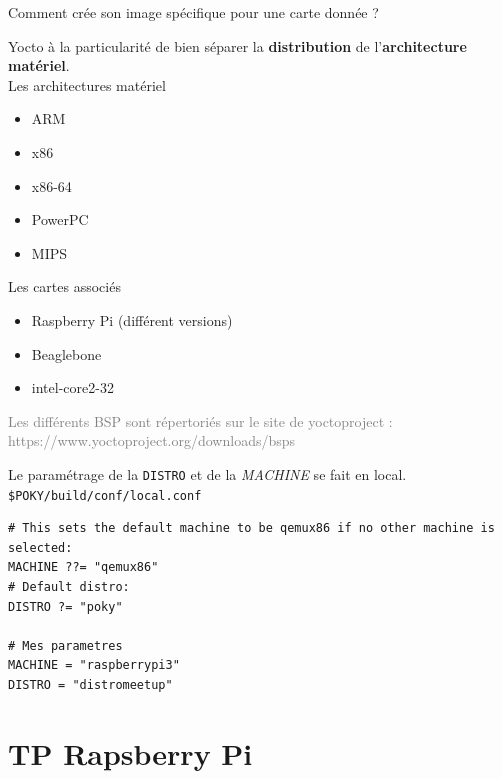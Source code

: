 \documentclass[compress]{smilebeamer}
\begin{document}
\begin{frame}
\begin{center}
\huge{Comment crée son image spécifique pour une carte donnée ?}
\end{center}
\end{frame}

\begin{frame}
Yocto à la particularité de bien séparer la \textbf{distribution} de l'\textbf{architecture matériel}.
\newline \\
Les architectures matériel
\begin{itemize}
	\item ARM
	\item x86
	\item x86-64
	\item PowerPC
	\item MIPS
\end{itemize}
Les cartes associés
\begin{itemize}
	\item Raspberry Pi (différent versions)
	\item Beaglebone
	\item intel-core2-32
\end{itemize}
\textcolor{gray}{\tiny{Les différents BSP sont répertoriés sur le site de yoctoproject : https://www.yoctoproject.org/downloads/bsps}}
\end{frame}

\begin{frame}[fragile]
Le paramétrage de la \texttt{DISTRO} et de la \textsl{MACHINE} se fait en local.
\newline \\
\texttt{\$POKY/build/conf/local.conf}
\begin{lstlisting}[style=bitbake]
# This sets the default machine to be qemux86 if no other machine is selected:
MACHINE ??= "qemux86"
# Default distro:
DISTRO ?= "poky"

# Mes parametres
MACHINE = "raspberrypi3"
DISTRO = "distromeetup"
\end{lstlisting}
\end{frame}


\section{TP Rapsberry Pi}
\end{document}
